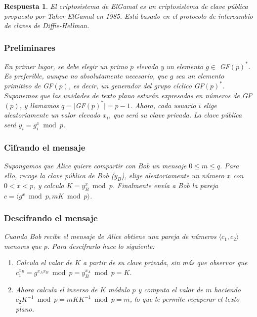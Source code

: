 \documentclass[
  a4paper,
  spanish,
  12pt,
]{scrartcl}
\theoremstyle{ejercicio-style}
\theoremstyle{remark-style}
\newtheorem*{sol}{Respuesta}
\theoremstyle{teorema-style}
\begin{document}
\begin{sol}
El criptosistema de ElGamal es un criptosistema de clave pública propuesto por Taher ElGamal en 1985. Está basado en el protocolo de intercambio de claves de Diffie-Hellman.

\subsubsection*{Preliminares}

En primer lugar, se debe elegir un primo $p$ elevado y un elemento  $g \in$ GF$(p)^\ast$. Es preferible, aunque no absolutamente necesario, que $g$ sea un elemento primitivo de GF$(p)$, es decir, un generador del grupo cíclico GF$(p)^\ast$. Suponemos que las unidades de texto plano estarán expresadas en números de GF$(p)$, y llamamos $q = |$GF$(p)^\ast| = p -1$. Ahora, cada usuario $i$ elige aleatoriamente un valor elevado $x_i$, que será su clave privada. La clave pública será $y_i = g^x_i \bmod p$.

\subsubsection*{Cifrando el mensaje}

Supongamos que Alice quiere compartir con Bob un mensaje \(0\leq m \leq q\). Para ello, recoge la clave pública de Bob ($y_B$), elige aleatoriamente un número $x$ con $0 < x < p$, y calcula $K = y_B ^{x} \bmod p$. Finalmente envía a Bob la pareja \(c = \langle g^{x} \bmod{p}, mK \bmod p\rangle\).

\subsubsection*{Descifrando el mensaje}

Cuando Bob recibe el mensaje de Alice obtiene una pareja de números $\langle c_1, c_2 \rangle$ menores que $p$. Para descifrarlo hace lo siguiente:

\begin{enumerate}
  \item Calcula el valor de $K$ a partir de su clave privada, sin más que observar que $c_1^{x_B} = g^{x_Ax_B} \bmod p = y_B^{x_A} \bmod p = K$.
  \item Ahora calcula el inverso de $K$ módulo $p$ y computa el valor de $m$ haciendo $c_2K^{-1} \bmod p = mKK^{-1} \bmod p = m$, lo que le permite recuperar el texto plano.
\end{enumerate}


\end{sol}
\end{document}
